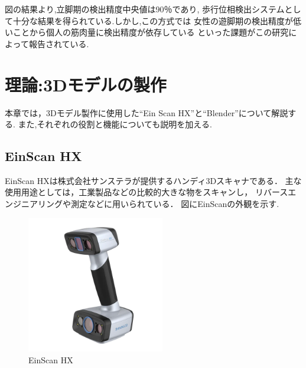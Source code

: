 \documentclass{ltjsreport}
\begin{document}
		図の結果より,立脚期の検出精度中央値は90％であり,
		歩行位相検出システムとして十分な結果を得られている.しかし,この方式では
		女性の遊脚期の検出精度が低いことから個人の筋肉量に検出精度が依存している
		といった課題がこの研究によって報告されている.



\chapter{理論:3Dモデルの製作}
	本章では，3Dモデル製作に使用した``Ein Scan HX''と``Blender''について解説する.
	また,それぞれの役割と機能についても説明を加える.

	\section{EinScan HX}
		EinScan HXは株式会社サンステラが提供するハンディ3Dスキャナである．
		主な使用用途としては，工業製品などの比較的大きな物をスキャンし，
		リバースエンジニアリングや測定などに用いられている．
		図にEinScanの外観を示す.

		\begin{figure}[H]
		\centering
		\includegraphics[width = 6cm]{../figs/EinScan.png}
		\caption{EinScan HX}
		\label{fig:EinScan}
		\end{figure}
\end{document}
